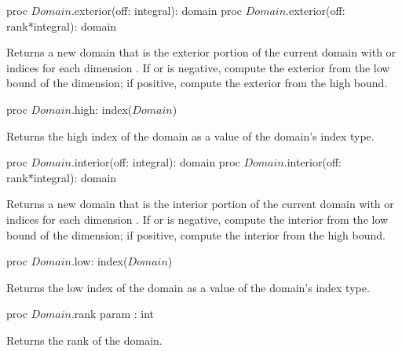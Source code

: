 \begin{protohead}
proc $Domain$.exterior(off: integral): domain
proc $Domain$.exterior(off: rank*integral): domain
\end{protohead}
\begin{protobody}
Returns a new domain that is the exterior portion of the current
domain with  or  indices for each
dimension .  If  or  is negative,
compute the exterior from the low bound of the dimension; if positive,
compute the exterior from the high bound.
\end{protobody}

\begin{protohead}
proc $Domain$.high: index($Domain$)
\end{protohead}
\begin{protobody}
Returns the high index of the domain as a value of the domain's index
type.
\end{protobody}

\begin{protohead}
proc $Domain$.interior(off: integral): domain
proc $Domain$.interior(off: rank*integral): domain
\end{protohead}
\begin{protobody}
Returns a new domain that is the interior portion of the current
domain with  or  indices for each
dimension .  If  or  is negative,
compute the interior from the low bound of the dimension; if positive,
compute the interior from the high bound.
\end{protobody}

\begin{protohead}
proc $Domain$.low: index($Domain$)
\end{protohead}
\begin{protobody}
Returns the low index of the domain as a value of the domain's index
type.
\end{protobody}

\begin{protohead}
proc $Domain$.rank param : int
\end{protohead}
\begin{protobody}
Returns the rank of the domain.
\end{protobody}


